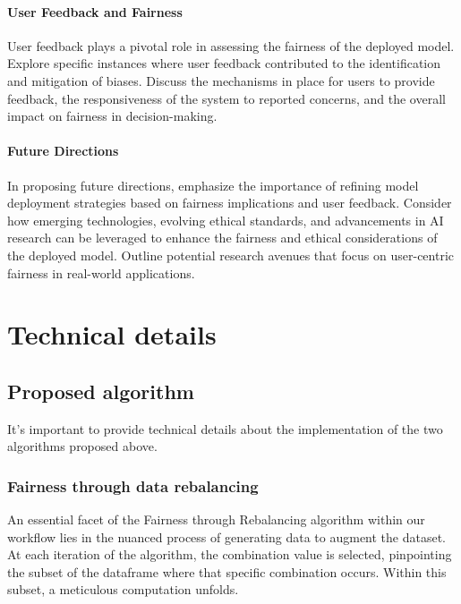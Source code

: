 \documentclass[12pt,a4paper,openright,twoside]{book}
\begin{document}
\subsubsection{User Feedback and Fairness}

User feedback plays a pivotal role in assessing the fairness of the deployed model. Explore specific instances where user feedback contributed to the identification and mitigation of biases. Discuss the mechanisms in place for users to provide feedback, the responsiveness of the system to reported concerns, and the overall impact on fairness in decision-making.

\subsubsection{Future Directions}

In proposing future directions, emphasize the importance of refining model deployment strategies based on fairness implications and user feedback. Consider how emerging technologies, evolving ethical standards, and advancements in AI research can be leveraged to enhance the fairness and ethical considerations of the deployed model. Outline potential research avenues that focus on user-centric fairness in real-world applications.

\chapter{Technical details}
\label{chap:technicals}

\section{Proposed algorithm}

It's important to provide technical details about the implementation of the two algorithms proposed above.

\subsection{Fairness through data rebalancing}

An essential facet of the Fairness through Rebalancing algorithm within our workflow lies in the nuanced process of generating data to augment the dataset. At each iteration of the algorithm, the combination value is selected, pinpointing the subset of the dataframe where that specific combination occurs. Within this subset, a meticulous computation unfolds.
\end{document}

